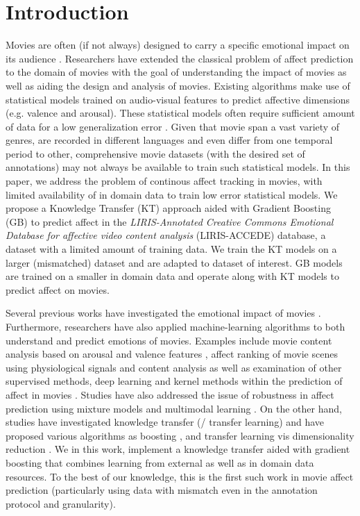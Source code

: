 \documentclass{article}
\begin{document}
\section{Introduction}
\label{sec:intro}
Movies are often (if not always) designed to carry a specific emotional impact on its audience \cite{}.
Researchers have extended the classical problem of affect prediction to the domain of movies with the goal of understanding the impact of movies as well as aiding the design and analysis of movies. 
Existing algorithms make use of statistical models trained on audio-visual features to predict affective dimensions (e.g. valence and arousal).  
These statistical models often require sufficient amount of data for a low generalization error \cite{}.
Given that movie span a vast variety of genres, are recorded in different languages and even differ from one temporal period to other, comprehensive movie datasets (with the desired set of annotations) may not always be available to train such statistical models. 
In this paper, we address the problem of continous affect tracking in movies, with limited availability of in domain data to train low error statistical models. 
We propose a Knowledge Transfer (KT) approach aided with Gradient Boosting (GB) to predict affect in the {\it LIRIS-Annotated Creative Commons Emotional Database for affective video content analysis} (LIRIS-ACCEDE) database, a dataset with a limited amount of training data.
We train the KT models on a larger (mismatched) dataset and are adapted to dataset of interest. 
GB models are trained on a smaller in domain data and operate along with KT models to predict affect on movies.

Several previous works have investigated the emotional impact of movies \cite{bartsch2010predicting, carroll2010movies}. 
Furthermore, researchers have also applied machine-learning algorithms to both understand and predict emotions of movies.
Examples include movie content analysis based on arousal and valence features \cite{xu2008hierarchical}, affect ranking of movie scenes using physiological signals and content analysis \cite{soleymani2008affective} as well as examination of other supervised methods, deep learning and kernel methods within the prediction of affect in movies \cite{malandrakis2011supervised, baveye2015deep}.
Studies have also addressed the issue of robustness in affect prediction using mixture models \cite{goyal2015multimodal} and multimodal learning \cite{pang2015mutlimodal}. 
On the other hand, studies have investigated knowledge transfer (/ transfer learning) and have proposed various algorithms as boosting \cite{dai2007boosting}, and transfer learning vis dimensionality reduction \cite{}.	 
We in this work, implement a knowledge transfer aided with gradient boosting that combines learning from external as well as in domain data resources.
To the best of our knowledge, this is the first such work in movie affect prediction (particularly using data with mismatch even in the annotation protocol and granularity). 
\end{document}
